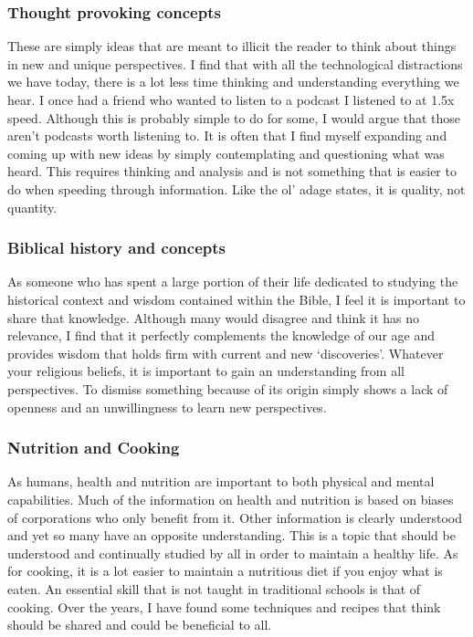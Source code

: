 \documentclass[10pt, a4paper, twocolumn]{book}
\begin{document}
\subsubsection*{Thought provoking concepts}
These are simply ideas that are meant to illicit the reader to think about things in new and unique perspectives. I find that with all the technological distractions we have today, there is a lot less time thinking and understanding everything we hear. I once had a friend who wanted to listen to a podcast I listened to at 1.5x speed. Although this is probably simple to do for some, I would argue that those aren't podcasts worth listening to. It is often that I find myself expanding and coming up with new ideas by simply contemplating and questioning what was heard. This requires thinking and analysis and is not something that is easier to do when speeding through information. Like the ol' adage states, it is quality, not quantity. 

\subsubsection*{Biblical history and concepts}
As someone who has spent a large portion of their life dedicated to studying the historical context and wisdom contained within the Bible, I feel it is important to share that knowledge. Although many would disagree and think it has no relevance, I find that it perfectly complements the knowledge of our age and provides wisdom that holds firm with current and new `discoveries'. Whatever your religious beliefs, it is important to gain an understanding from all perspectives. To dismiss something because of its origin simply shows a lack of openness and an unwillingness to learn new perspectives.


\subsubsection*{Nutrition and Cooking}
As humans, health and nutrition are important to both physical and mental capabilities. Much of the information on health and nutrition is based on biases of corporations who only benefit from it. Other information is clearly understood and yet so many have an opposite understanding. This is a topic that should be understood and continually studied by all in order to maintain a healthy life. As for cooking, it is a lot easier to maintain a nutritious diet if you enjoy what is eaten. An essential skill that is not taught in traditional schools is that of cooking. Over the years, I have found some techniques and recipes that think should be shared and could be beneficial to all.
\end{document}
